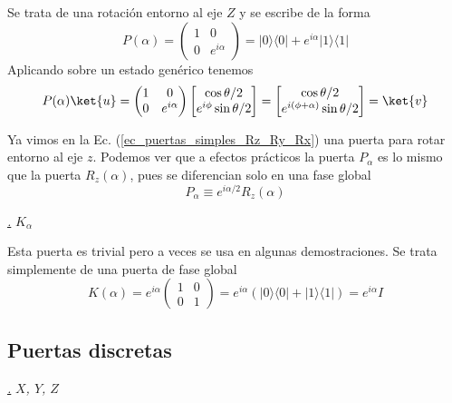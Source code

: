 \documentclass[a4paper,11pt]{book} %
\numberwithin{equation}{chapter}
\def\lp{\left(}
\def\rp{\right)}
\newcommand{\ketbra}[2]{| #1\rangle \! \langle #2|}
\def\subsubiContadorIt{\par\addtocounter{subsubsection}{1}\underline{\it\thesubsubsection.}\hskip0.5cm \setcounter{subsubsubsectionIt}{0}}
\newcommand{\SubsubiIt}[1]{
		\subsubiContadorIt \textit{#1}
	}
\newcounter{subsubsubsectionIt}[subsubsection]
\begin{document}
Se trata de una rotación entorno al eje $Z$ y se escribe de la forma		    
	\begin{equation}
	\boxed{P(\alpha)= \lp \begin{matrix}
	1 & 0 \\ 0 & e^{i\alpha} 
	\end{matrix} \rp =  \ketbra{0}{0} + e^{i\alpha}\ketbra{1}{1}}
	\end{equation}
Aplicando sobre un estado genérico tenemos
	\begin{equation*}
	P(\alpha) \ket{u} =  
	\lp \begin{matrix} 1 & 0 \\ 0 & e^{i\alpha} \end{matrix} \rp 
	\begin{bmatrix} \cos\theta/2 \\ e^{i\phi}  \sin\theta/2 \end{bmatrix} =
	 \begin{bmatrix} \cos\theta/2 \\ e^{i(\phi+\alpha)}  \sin\theta/2 \end{bmatrix} = 
	 \ket{v}
	\end{equation*}

Ya vimos en la Ec. (\ref{ec_puertas_simples_Rz_Ry_Rx}) una puerta para rotar entorno al eje $z$. Podemos ver que a efectos prácticos la puerta $P_\alpha$ es lo mismo que la puerta $R_z(\alpha)$, pues se diferencian solo en una fase global
	\begin{equation*}
	P_\alpha \equiv e^{i \alpha/2} R_z (\alpha)
	\end{equation*}
		    
		    		    
		    \SubsubiIt{$K_\alpha$}  

Esta puerta es trivial pero a veces se usa en algunas demostraciones. Se trata simplemente de una puerta de fase global
	\begin{equation}
	K(\alpha)= e^{i\alpha} \lp \begin{matrix} 1 & 0 \\ 0 & 1 \end{matrix} \rp =  
	e^{i\alpha} \lp  \ketbra{0}{0} + \ketbra{1}{1} \right) = e^{i\alpha} I 
	\end{equation}
    	
        \subsection{Puertas discretas}
        
            \SubsubiIt{$X$, $Y$, $Z$}
\end{document}
